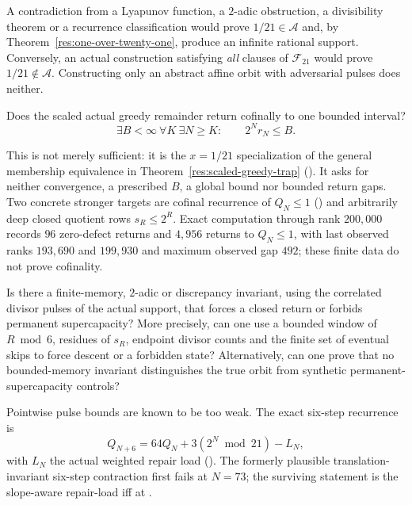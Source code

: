 \documentclass[11pt]{article}
\newcommand{\Ach}{\mathcal A}
\begin{document}
\noindent A contradiction from a Lyapunov function, a $2$-adic obstruction,
a divisibility theorem or a recurrence classification would prove
$1/21\in\Ach$ and, by Theorem~\ref{res:one-over-twenty-one}, produce an
infinite rational support.  Conversely, an actual construction satisfying
\emph{all} clauses of $\mathcal F_{21}$ would prove $1/21\notin\Ach$.
Constructing only an abstract affine orbit with adversarial pulses does
neither.

\begin{problem}\label{prob:scaled-return}
Does the scaled actual greedy remainder return cofinally to one bounded
interval?
\[
 \exists B<\infty\ \forall K\ \exists N\ge K:
 \qquad 2^N r_N\le B.
\]
\end{problem}

\noindent This is not merely sufficient: it is the $x=1/21$ specialization
of the general membership equivalence in
Theorem~\ref{res:scaled-greedy-trap}
().
It asks for neither convergence, a prescribed $B$, a global bound nor bounded
return gaps.  Two concrete stronger targets are cofinal recurrence of
$Q_N\le1$
()
and arbitrarily deep closed quotient rows $s_R\le2^R$.  Exact computation
through rank $200{,}000$ records $96$ zero-defect returns and $4{,}956$ returns
to $Q_N\le1$, with last observed ranks $193{,}690$ and $199{,}930$ and maximum
observed gap $492$; these finite data do not prove cofinality.

\begin{problem}\label{prob:actual-invariant}
Is there a finite-memory, $2$-adic or discrepancy invariant, using the
correlated divisor pulses of the actual support, that forces a closed return
or forbids permanent supercapacity?  More precisely, can one use a bounded
window of $R\bmod6$, residues of $s_R$, endpoint divisor counts and the finite
set of eventual skips to force descent or a forbidden state?  Alternatively,
can one prove that no bounded-memory invariant distinguishes the true orbit
from synthetic permanent-supercapacity controls?
\end{problem}

\noindent Pointwise pulse bounds are known to be too weak.  The exact
six-step recurrence is
\[
 Q_{N+6}=64Q_N+3(2^N\bmod21)-L_N,
\]
with $L_N$ the actual weighted repair load
().
The formerly plausible translation-invariant six-step contraction first
fails at $N=73$; the surviving statement is the slope-aware repair-load iff
at
.
\end{document}
